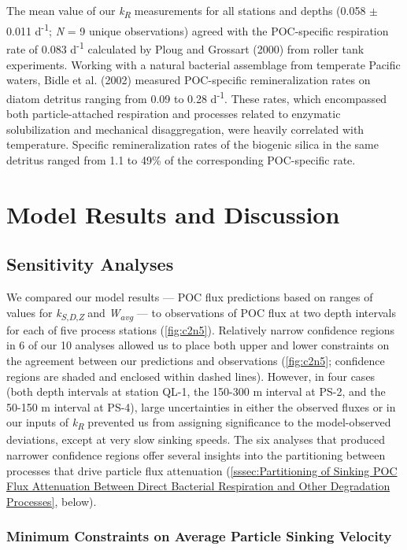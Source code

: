 The mean value of our \emph{k\textsubscript{R}} measurements for all stations and depths (0.058 $\pm$ 0.011 d\textsuperscript{-1}; \emph{N} = 9 unique observations) agreed with the POC-specific respiration rate of 0.083 d\textsuperscript{-1} calculated by Ploug and Grossart (2000) from roller tank experiments. Working with a natural bacterial assemblage from temperate Pacific waters, Bidle et al. (2002) measured POC-specific remineralization rates on diatom detritus ranging from 0.09 to 0.28 d\textsuperscript{-1}. These rates, which encompassed both particle-attached respiration and processes related to enzymatic solubilization and mechanical disaggregation, were heavily correlated with temperature. Specific remineralization rates of the biogenic silica in the same detritus ranged from 1.1 to 49\% of the corresponding POC-specific rate.

\section{Model Results and Discussion}

\subsection{Sensitivity Analyses}

We compared our model results --- POC flux predictions based on ranges of values for \emph{k\textsubscript{S}}\textsubscript{,\emph{D},\emph{Z}} and \emph{W\textsubscript{avg}} --- to observations of POC flux at two depth intervals for each of five process stations (\autoref{fig:c2n5}). Relatively narrow confidence regions in 6 of our 10 analyses allowed us to place both upper and lower constraints on the agreement between our predictions and observations (\autoref{fig:c2n5}; confidence regions are shaded and enclosed within dashed lines). However, in four cases (both depth intervals at station QL-1, the 150-300 m interval at PS-2, and the 50-150 m interval at PS-4), large uncertainties in either the observed fluxes or in our inputs of \emph{k\textsubscript{R}} prevented us from assigning significance to the model-observed deviations, except at very slow sinking speeds. The six analyses that produced narrower confidence regions offer several insights into the partitioning between processes that drive particle flux attenuation (\autoref{sssec:Partitioning of Sinking POC Flux Attenuation Between Direct Bacterial Respiration and Other Degradation Processes}, below).

\subsubsection{Minimum Constraints on Average Particle Sinking Velocity}
\label{sssec:Minimum Constraints on Average Particle Sinking Velocity}

